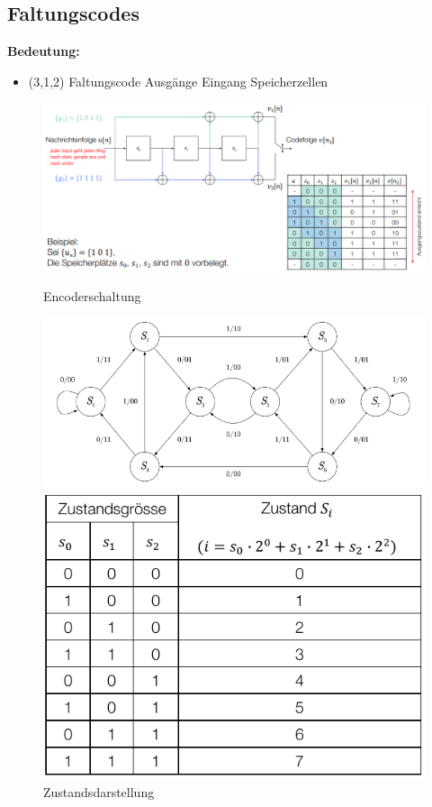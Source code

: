 \subsection{Faltungscodes}
\textbf{Bedeutung:} \\
\begin{itemize}
	\item (3,1,2) Faltungscode
		 Ausgänge
		 Eingang
		 Speicherzellen
\end{itemize}

\begin{figure}[h!]
	\centering
	\begin{minipage}[t]{0.7\textwidth}
		\centering
		\includegraphics[width=0.9\linewidth]{images/encoderschaltung}
		\caption{Encoderschaltung}
		\label{fig:encoderschaltung}
	\end{minipage}
	\begin{minipage}[t]{0.6\textwidth}
		\centering
		\includegraphics[width=0.9\linewidth]{images/zustandsdarstellung}
		\caption{Zustandsdarstellung}
		\label{fig:zustandsdarstellung}
	\end{minipage}
		\begin{minipage}[t]{0.5\textwidth}
		\centering
		\includegraphics[width=0.9\linewidth]{images/zustandstabelle}

\end{minipage}
\end{figure}
